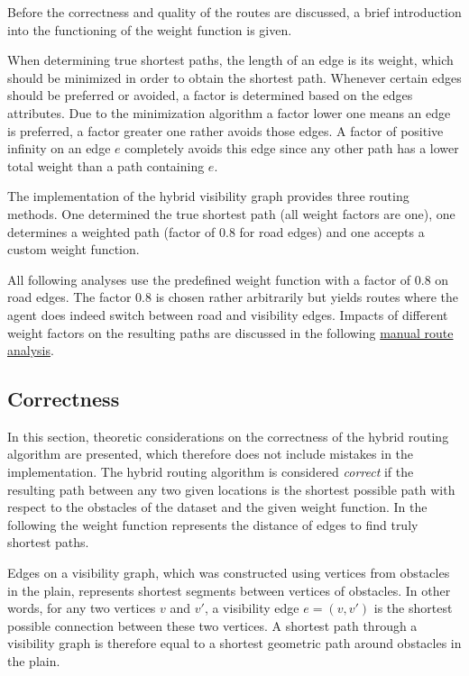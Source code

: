 		Before the correctness and quality of the routes are discussed, a brief introduction into the functioning of the weight function is given.
		
		When determining true shortest paths, the length of an edge is its weight, which should be minimized in order to obtain the shortest path.
		Whenever certain edges should be preferred or avoided, a factor is determined based on the edges attributes.
		Due to the minimization algorithm a factor lower one means an edge is preferred, a factor greater one rather avoids those edges.
		A factor of positive infinity on an edge $e$ completely avoids this edge since any other path has a lower total weight than a path containing $e$.
		
		The implementation of the hybrid visibility graph provides three routing methods.
		One determined the true shortest path (all weight factors are one), one determines a weighted path (factor of 0.8 for road edges) and one accepts a custom weight function.
		
		All following analyses use the predefined weight function with a factor of 0.8 on road edges.
		The factor 0.8 is chosen rather arbitrarily but yields routes where the agent does indeed switch between road and visibility edges.
		Impacts of different weight factors on the resulting paths are discussed in the following \hyperref[subsubsec:manual-route-analysis]{manual route analysis}.

	\subsection{Correctness}
	\label{subsec:correctness}
	
		In this section, theoretic considerations on the correctness of the hybrid routing algorithm are presented, which therefore does not include mistakes in the implementation.
		The hybrid routing algorithm is considered \emph{correct} if the resulting path between any two given locations is the shortest possible path with respect to the obstacles of the dataset and the given weight function.
		In the following the weight function represents the distance of edges to find truly shortest paths.
		
		Edges on a visibility graph, which was constructed using vertices from obstacles in the plain, represents shortest segments between vertices of obstacles.
		In other words, for any two vertices $v$ and $v'$, a visibility edge $e=(v, v')$ is the shortest possible connection between these two vertices.
		A shortest path through a visibility graph is therefore equal to a shortest geometric path around obstacles in the plain.
		

